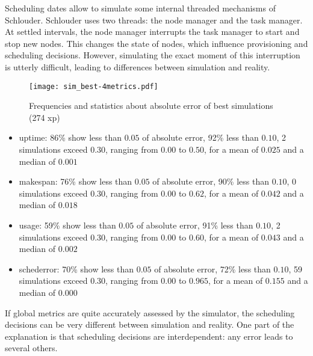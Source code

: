 Scheduling dates allow to simulate some internal threaded mechanisms of 
Schlouder.
Schlouder uses two threads: the node manager and the task manager.
At settled intervals, the node manager interrupts the task manager to start and 
stop new nodes.
This changes the state of nodes, which influence provisioning and scheduling 
decisions.
However, simulating the exact moment of this interruption is utterly difficult, 
leading to differences between simulation and reality.


\begin{figure}
  \centering

  \texttt{[image: sim\_best-4metrics.pdf]}
  
  
  
\caption{Frequencies and statistics about absolute error of best simulations (274 xp)}
\end{figure} 

 


\begin{itemize}
 \item uptime: 
      86\% show less than $0.05$ of absolute error, 
      92\% less than $0.10$, 
      2 simulations exceed $0.30$,
      ranging from $0.00$ to $0.50$, for a mean of $0.025$ and a median of $0.001$
 \item makespan: 
      76\% show less than $0.05$ of absolute error, 
      90\% less than $0.10$, 
      0 simulations exceed $0.30$,
      ranging from $0.00$ to $0.62$, for a mean of $0.042$ and a median of $0.018$
 \item usage: 
      59\% show less than $0.05$ of absolute error, 
      91\% less than $0.10$, 
      2 simulations exceed $0.30$,
      ranging from $0.00$ to $0.60$, for a mean of $0.043$ and a median of $0.002$
 \item schederror: 
      70\% show less than $0.05$ of absolute error, 
      72\% less than $0.10$, 
      59 simulations exceed $0.30$,
      ranging from $0.00$ to $0.965$, for a mean of $0.155$ and a median of $0.000$
\end{itemize}

If global metrics are quite accurately assessed by the simulator, 
the scheduling decisions can be very different between simulation and reality. 
One part of the explanation is that scheduling decisions are interdependent: 
any error leads to several others.


